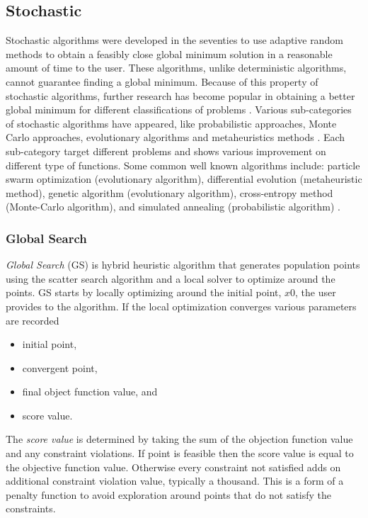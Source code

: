 \subsection{Stochastic}
Stochastic algorithms were developed in the seventies to use adaptive random methods to obtain a feasibly close global minimum solution in a reasonable amount of time to the user. These algorithms, unlike deterministic algorithms, cannot guarantee finding a global minimum. Because of this property of stochastic algorithms, further research has become popular in obtaining a better global minimum for different classifications of problems \cite{Aguiar,Pinter2002}. Various sub-categories of stochastic algorithms have appeared, like probabilistic approaches, Monte Carlo approaches, evolutionary algorithms \cite{Aguiar} and metaheuristics methods
\cite{Can2015}. Each sub-category target different problems
and shows various improvement on different type of functions. Some common well known algorithms include: particle swarm optimization (evolutionary algorithm), differential evolution (metaheuristic method), genetic algorithm (evolutionary algorithm), cross-entropy method (Monte-Carlo algorithm), and simulated annealing (probabilistic algorithm) \cite{Aguiar}.  

\subsubsection{Global Search}
\textit{Global Search} (GS) is hybrid heuristic algorithm that generates population points using the scatter search algorithm \cite{Glover1998} and a local solver to optimize around the points. GS starts by locally optimizing around the initial point, $x0$, the user provides to the algorithm. If the local optimization converges various parameters are recorded
\begin{itemize}
    \item initial point,
    \item convergent point,
    \item final object function value, and
    \item score value. 
\end{itemize}

The \textit{score value} is determined by taking the sum of the objection function value and any constraint violations. If point is feasible then the score value is equal to the objective function value. Otherwise every constraint not satisfied adds on additional constraint violation value, typically a thousand. This is a form of a penalty function to avoid exploration around points that do not satisfy the constraints. 

